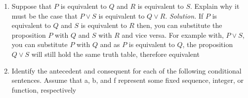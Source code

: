 \documentclass{article}
\begin{document}
\begin{enumerate}
        \item Suppose that $P$ is equivalent to $Q$ and $R$ is equivalent to $S$. 
              Explain why it must be the case that $P \vee S$
              is equivalent to $Q \vee R$. 
            \vskip1mm
            \emph{Solution.} 
                If $P$ is equivalent to $Q$ and $S$ is equivalent to $R$ then, 
                you can substitute the proposition $P$ with $Q$ and $S$ with $R$ 
                and vice versa. For example with, $P \vee S$, you can substitute
                $P$ with $Q$ and as $P$ is equivalent to $Q$, the proposition
                $Q \vee S$ will still hold the same truth table, therefore equivalent
        \item Identify the antecedent and consequent for each of the following conditional sentences. 
              Assume that a, b, and f represent some fixed sequence, integer,
              or function, respectively
            \begin{enumerate}

\end{enumerate}
\end{enumerate}
\end{document}
